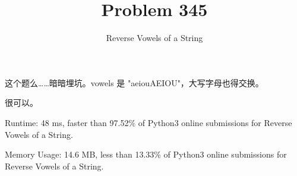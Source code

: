 \documentclass[UTF8]{ctexart}
\title{Problem 345}
\author{Reverse Vowels of a String}
\begin{document}
\maketitle

这个题么……暗暗埋坑。vowels 是 "aeiouAEIOU"，大写字母也得交换。

很可以。

Runtime: 48 ms, faster than 97.52\% of Python3 online submissions for Reverse Vowels of a String.

Memory Usage: 14.6 MB, less than 13.33\% of Python3 online submissions for Reverse Vowels of a String.
\end{document}
